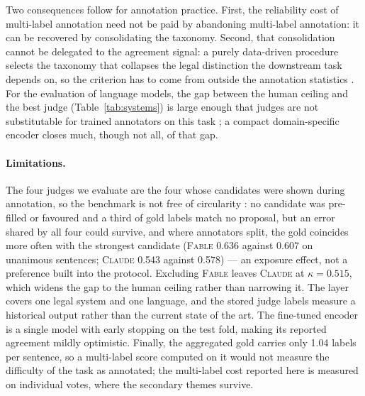 Two consequences follow for annotation practice. First, the reliability cost of
multi-label annotation need not be paid by abandoning multi-label annotation: it
can be recovered by consolidating the taxonomy. Second, that consolidation cannot be
delegated to the agreement signal: a purely data-driven procedure selects the
taxonomy that collapses the legal distinction the downstream
task depends on, so the criterion has to come from outside the annotation
statistics \cite{eu1993directive,micklitz2017empire}. For the evaluation of language models, the gap between the human
ceiling and the best judge (Table~\ref{tab:systems}) is large enough that judges
are not substitutable for trained annotators on this task
\cite{thalken2023legal,bavaresco2025judges}; a compact domain-specific encoder
closes much, though not all, of that gap.

\paragraph{Limitations.}
The four judges we evaluate are the four whose candidates were shown during
annotation, so the benchmark is not free of circularity \cite{choi2024llmeffect}: no
candidate was pre-filled or favoured and a third of gold labels match no proposal,
but an error shared by all four could survive, and where annotators split, the gold
coincides more often with the strongest candidate (\textsc{Fable} 0.636 against 0.607
on unanimous sentences; \textsc{Claude} 0.543 against 0.578) --- an exposure effect,
not a preference built into the protocol. Excluding \textsc{Fable} leaves
\textsc{Claude} at
$\kappa = 0.515$, which widens the gap to the human ceiling rather than narrowing
it. The layer covers one legal system and one language, and the stored judge
labels measure a historical output rather than the current state of the art. The
fine-tuned encoder is a single model with early stopping on the test fold, making
its reported agreement mildly optimistic.
Finally, the aggregated gold carries only 1.04 labels per sentence, so a
multi-label score computed on it would not measure the difficulty of the task as
annotated; the multi-label cost reported here is measured on individual votes,
where the secondary themes survive.
